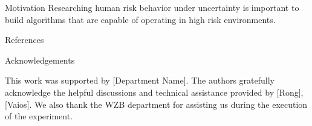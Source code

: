 \documentclass[final]{beamer}
\newlength{\onecolwid}
\begin{document}
\begin{frame}
\begin{columns}[t]
\begin{column}{\onecolwid}
\begin{exampleblock}{Motivation}
Researching human risk behavior under uncertainty is important to build algorithms that are capable of operating in high risk environments.



\end{exampleblock}






\begin{exampleblock}{References}

\nocite{*} %
\small{
\vspace{1cm}}
\end{exampleblock}






\begin{block}{Acknowledgements}

This work was supported by [Department Name]. The authors gratefully acknowledge the helpful discussions and technical assistance provided by [Rong], [Vaios].
We also thank the WZB department for assisting us during the execution of the experiment.


\end{block}
\end{column}
\end{columns}
\end{frame}
\end{document}
